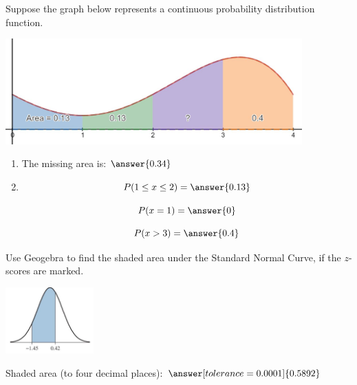 \documentclass{ximera}
\begin{document}
\begin{problem}\label{prob:exam2prob2}
Suppose the graph below represents a continuous probability distribution function.
\begin{image}
\includegraphics[height=1.6in]{test2pic3.JPG}
\end{image}
  \begin{enumerate}
      \item The missing area is: $\answer{0.34}$
      \item 
      
          $$P(1\leq x\leq 2)=\answer{0.13}$$
  
          $$P(x=1)=\answer{0}$$
   
          $$P(x>3)=\answer{0.4}$$
    
     
  \end{enumerate}
\end{problem}

\begin{problem}\label{prob:exam2prob3}
Use Geogebra to find the shaded area under the Standard Normal Curve, if the $z$-scores are marked. \begin{image}
\includegraphics[height=1in]{test2pic2.JPG}
\end{image}

Shaded area (to four decimal places): $\answer[tolerance=0.0001]{0.5892}$
\end{problem}
\end{document}
